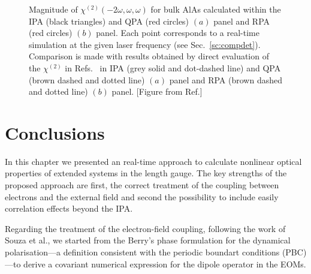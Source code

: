 \begin{figure}[ht]
\centering
{}
\caption{\footnotesize{Magnitude of $\chi^{(2)}(-2\omega,\omega,\omega)$ for bulk AlAs calculated within the IPA (black triangles) and QPA (red circles) $(a)$ panel and RPA (red circles) $(b)$ panel. Each point corresponds to a real-time simulation at the given laser frequency (see Sec.~\ref{sc:compdet}). Comparison is made with results obtained \ai by direct evaluation of the $\chi^{(2)}$ in Refs.~\cite{PhysRevB.82.235201,PSSB.427.1984} in IPA (grey solid and dot-dashed line) and QPA (brown dashed and dotted line) $(a)$ panel and RPA (brown dashed and dotted line) $(b)$ panel. \label{fg:AlAsQPRPA} [Figure from Ref.\cite{nloptics2013}] }}
\end{figure}

\section{Conclusions}\label{conclusion}                                        
In this chapter we presented an \ai real-time approach to calculate nonlinear optical properties of extended systems in the length gauge. The key strengths of the proposed approach are first, the correct treatment of the coupling between electrons and the external field and second the possibility to include easily correlation effects beyond the IPA.

Regarding the treatment of the electron-field coupling, following the work of Souza et al.\cite{souza_prb}, we started from the Berry's phase formulation for the dynamical polarisation---a definition consistent with the periodic boundart conditions (PBC)---to derive a covariant numerical expression for the dipole operator in the EOMs.

